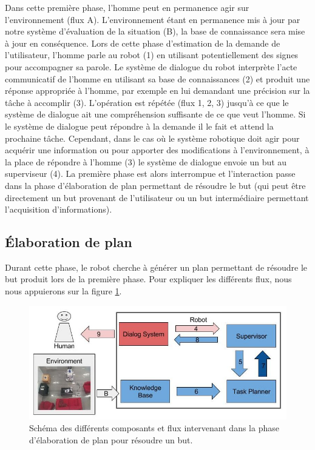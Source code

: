 \documentclass[a4paper,11pt,twoside]{StyleThese}
\begin{document}
Dans cette première phase, l'homme peut en permanence agir sur l'environnement (flux A). L'environnement étant en permanence mis à jour par notre système d'évaluation de la situation (B), la base de connaissance sera mise à jour en conséquence.
Lors de cette phase d'estimation de la demande de l'utilisateur, l'homme parle au robot (1) en utilisant potentiellement des signes pour accompagner sa parole. Le système de dialogue du robot interprète l'acte communicatif de l'homme en utilisant sa base de connaissances (2) et produit une réponse appropriée à l'homme, par exemple en lui demandant une précision sur la tâche à accomplir (3). L'opération est répétée (flux 1, 2, 3) jusqu'à ce que le système de dialogue ait une compréhension suffisante de ce que veut l'homme. Si le système de dialogue peut répondre à la demande il le fait et attend la prochaine tâche. Cependant, dans le cas où le système robotique doit agir pour acquérir une information ou pour apporter des modifications à l'environnement, à la place de répondre à l'homme (3) le système de dialogue envoie un but au superviseur (4). La première phase est alors interrompue et l'interaction passe dans la phase d'élaboration de plan permettant de résoudre le but (qui peut être directement un but provenant de l'utilisateur ou un but intermédiaire permettant l'acquisition d'informations).

\subsection{Élaboration de plan}
\label{sec:phase2}
Durant cette phase, le robot cherche à générer un plan permettant de résoudre le but produit lors de la première phase. Pour expliquer les différents flux, nous nous appuierons sur la figure \ref{fig:phase2}.

\begin{figure}[ht!]
 \centering
  \includegraphics[width=0.99\linewidth]{./img/phase2color.jpg} 
  \caption {Schéma des différents composants et flux intervenant dans la phase d'élaboration de plan pour résoudre un but.}
  \label{fig:phase2}
\end{figure}
\end{document}
